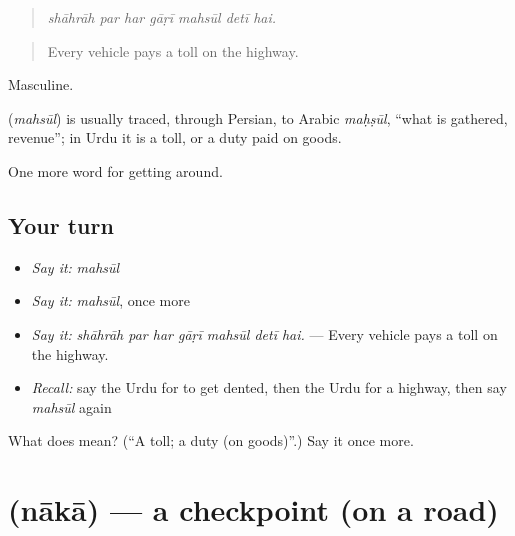 \begin{quote}
      
\end{quote}

\begin{quote}
\emph{shāhrāh par har gāṛī mahsūl detī hai.}
\end{quote}

\begin{quote}
Every vehicle pays a toll on the highway.
\end{quote}

Masculine.

\begin{cousinweb}
\textbf{} (\emph{mahsūl}) is usually traced, through Persian, to Arabic \emph{maḥṣūl}, \textquotedblleft{}what is gathered, revenue\textquotedblright{}; in Urdu it is a toll, or a duty paid on goods.
\end{cousinweb}

\begin{grammarlens}[title={What you've built}]
One more word for getting around.
\end{grammarlens}

\subsection*{Your turn}
\begin{itemize}
\raggedright
  \item \emph{Say it:} \emph{mahsūl}
  \item \emph{Say it:} \emph{mahsūl}, once more
  \item \emph{Say it:} \emph{shāhrāh par har gāṛī mahsūl detī hai.} — Every vehicle pays a toll on the highway.
  \item \emph{Recall:} say the Urdu for to get dented, then the Urdu for a highway, then say \emph{mahsūl} again
\end{itemize}

\begin{tcolorbox}[breakable,colback=teal!4,colframe=teal!35!black,title={Before you move on}]
What does  mean? (\textquotedblleft{}A toll; a duty (on goods)\textquotedblright{}.) Say it once more.
\end{tcolorbox}
\section[\texorpdfstring{\ur{ناکہ} (nākā)}{ناکہ (nākā)}]{ (nākā) — a checkpoint (on a road)}

